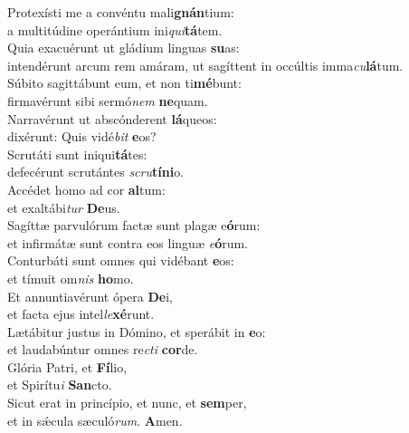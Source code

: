 \evenverse Protexísti me a convéntu mali\textbf{gnán}tium:~\*\\
\evenverse a multitúdine operántium ini\textit{qui}\textbf{tá}tem.\\
\oddverse Quia exacuérunt ut gládium linguas \textbf{su}as:~\*\\
\oddverse intendérunt arcum rem amáram, ut sagíttent in occúltis imma\textit{cu}\textbf{lá}tum.\\
\evenverse Súbito sagittábunt eum, et non ti\textbf{mé}bunt:~\*\\
\evenverse firmavérunt sibi sermó\textit{nem} \textbf{ne}quam.\\
\oddverse Narravérunt ut abscónderent \textbf{lá}queos:~\*\\
\oddverse dixérunt: Quis vidé\textit{bit} \textbf{e}os?\\
\evenverse Scrutáti sunt iniqui\textbf{tá}tes:~\*\\
\evenverse defecérunt scrutántes \textit{scru}\textbf{tí}\textbf{ni}o.\\
\oddverse Accédet homo ad cor \textbf{al}tum:~\*\\
\oddverse et exaltábi\textit{tur} \textbf{De}us.\\
\evenverse Sagíttæ parvulórum factæ sunt plagæ e\textbf{ó}rum:~\*\\
\evenverse et infirmátæ sunt contra eos linguæ \textit{e}\textbf{ó}rum.\\
\oddverse Conturbáti sunt omnes qui vidébant \textbf{e}os:~\*\\
\oddverse et tímuit om\textit{nis} \textbf{ho}mo.\\
\evenverse Et annuntiavérunt ópera \textbf{De}i,~\*\\
\evenverse et facta ejus intel\textit{le}\textbf{xé}runt.\\
\oddverse Lætábitur justus in Dómino, et sperábit in \textbf{e}o:~\*\\
\oddverse et laudabúntur omnes re\textit{cti} \textbf{cor}de.\\
\evenverse Glória Patri, et \textbf{Fí}lio,~\*\\
\evenverse et Spirítu\textit{i} \textbf{San}cto.\\
\oddverse Sicut erat in princípio, et nunc, et \textbf{sem}per,~\*\\
\oddverse et in sǽcula sæculó\textit{rum}. \textbf{A}men.\\

